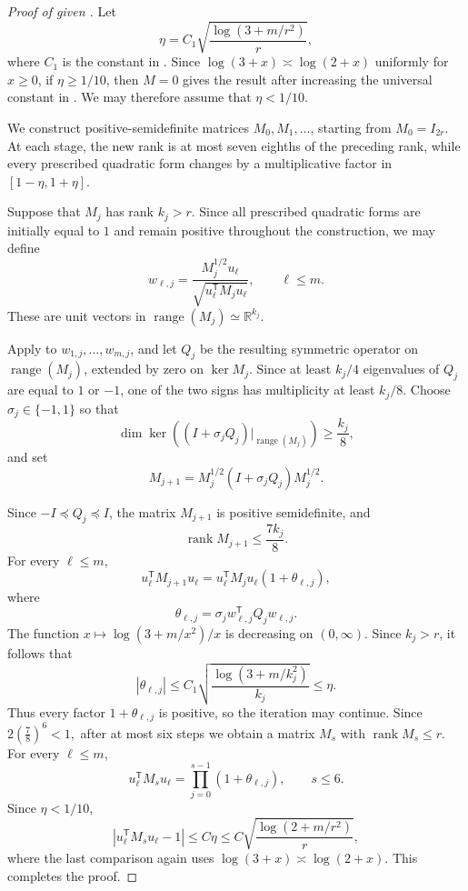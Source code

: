 \documentclass[11pt,reqno,letterpaper]{amsart}
\newcommand{\R}{\mathbb R}
\newcommand{\rank}{\operatorname{rank}}
\newcommand{\abs}[1]{\left\lvert #1\right\rvert}
\begin{document}
\begin{proof}[Proof of  given ]
Let
\[
 \eta
 =
 C_1\sqrt{\frac{\log(3+m/r^2)}{r}},
\]
where $C_1$ is the constant in .  Since
$\log(3+x)\asymp\log(2+x)$ uniformly for $x\geq0$, if
$\eta\geq1/10$, then $M=0$ gives the result after increasing the
universal constant in . We may therefore assume that
$\eta<1/10$.

We construct positive-semidefinite matrices $M_0,M_1,\ldots$, starting
from $M_0=I_{2r}$. At each stage, the new rank is at most seven eighths
of the preceding rank, while every prescribed
quadratic form changes by a multiplicative factor in
$[1-\eta,1+\eta]$.

Suppose that $M_j$ has rank $k_j>r$. Since all prescribed quadratic
forms are initially equal to $1$ and remain positive throughout the
construction, we may define
\[
 w_{\ell,j}
 =
 \frac{M_j^{1/2}u_\ell}
 {\sqrt{u_\ell^{\mathsf T}M_ju_\ell}},
 \qquad \ell\leq m.
\]
These are unit vectors in
$\operatorname{range}(M_j)\simeq\R^{k_j}$.

Apply  to $w_{1,j},\ldots,w_{m,j}$, and let $Q_j$
be the resulting symmetric operator on $\operatorname{range}(M_j)$,
extended by zero on $\ker M_j$. Since at least $k_j/4$ eigenvalues of
$Q_j$ are equal to $1$ or $-1$, one of the two signs has multiplicity
at least $k_j/8$. Choose $\sigma_j\in\{-1,1\}$ so that
\[
 \dim\ker\left(
 (I+\sigma_jQ_j)|_{\operatorname{range}(M_j)}
 \right)
 \geq\frac{k_j}{8},
\]
and set
\[
 M_{j+1}
 =
 M_j^{1/2}(I+\sigma_jQ_j)M_j^{1/2}.
\]


Since $-I\preceq Q_j\preceq I$, the matrix $M_{j+1}$ is positive
semidefinite, and
\[
 \rank M_{j+1}\leq\frac{7k_j}{8}.
\]
For every $\ell\leq m$,
\[
 u_\ell^{\mathsf T}M_{j+1}u_\ell
 =
 u_\ell^{\mathsf T}M_ju_\ell
 \left(1+\theta_{\ell,j}\right),
\]
where
\[
 \theta_{\ell,j}
 =
 \sigma_j w_{\ell,j}^{\mathsf T}Q_jw_{\ell,j}.
\]
The function
$
 x\mapsto{\log(3+m/x^2)}/{x}
$
is decreasing on $(0,\infty)$.  Since $k_j>r$, it follows that
\[
 \abs{\theta_{\ell,j}}
 \leq
 C_1\sqrt{\frac{\log(3+m/k_j^2)}{k_j}}
 \leq\eta.
\]
Thus every factor $1+\theta_{\ell,j}$ is positive, so the iteration may
continue.  Since
$
 2\left(\frac78\right)^6<1,
$
after at most six steps we obtain a matrix $M_s$ with
$\rank M_s\leq r$. For every $\ell\leq m$,
\[
 u_\ell^{\mathsf T}M_su_\ell
 =
 \prod_{j=0}^{s-1}(1+\theta_{\ell,j}),
 \qquad s\leq6.
\]
Since $\eta<1/10$,
\[
 \abs{u_\ell^{\mathsf T}M_su_\ell-1}
 \leq C\eta
 \leq C\sqrt{\frac{\log(2+m/r^2)}{r}},
\]
where the last comparison again uses
$\log(3+x)\asymp\log(2+x)$. This completes the proof.
\end{proof}
\end{document}
